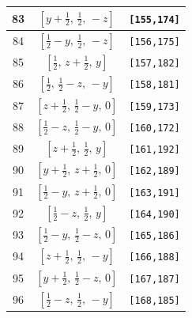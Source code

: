 \documentclass[fleqn,8pt]{jsarticle}
\begin{document}
\begin{longtable}{ccc}
83 & $\left[ y + \frac{1}{2},\, \frac{1}{2},\, - z \right]$ & {\tt [155,174]} \\ \hline
84 & $\left[ \frac{1}{2} - y,\, \frac{1}{2},\, - z \right]$ & {\tt [156,175]} \\ \hline
85 & $\left[ \frac{1}{2},\, z + \frac{1}{2},\, y \right]$ & {\tt [157,182]} \\ \hline
86 & $\left[ \frac{1}{2},\, \frac{1}{2} - z,\, - y \right]$ & {\tt [158,181]} \\ \hline
87 & $\left[ z + \frac{1}{2},\, \frac{1}{2} - y,\, 0 \right]$ & {\tt [159,173]} \\ \hline
88 & $\left[ \frac{1}{2} - z,\, \frac{1}{2} - y,\, 0 \right]$ & {\tt [160,172]} \\ \hline
89 & $\left[ z + \frac{1}{2},\, \frac{1}{2},\, y \right]$ & {\tt [161,192]} \\ \hline
90 & $\left[ y + \frac{1}{2},\, z + \frac{1}{2},\, 0 \right]$ & {\tt [162,189]} \\ \hline
91 & $\left[ \frac{1}{2} - y,\, z + \frac{1}{2},\, 0 \right]$ & {\tt [163,191]} \\ \hline
92 & $\left[ \frac{1}{2} - z,\, \frac{1}{2},\, y \right]$ & {\tt [164,190]} \\ \hline
93 & $\left[ \frac{1}{2} - y,\, \frac{1}{2} - z,\, 0 \right]$ & {\tt [165,186]} \\ \hline
94 & $\left[ z + \frac{1}{2},\, \frac{1}{2},\, - y \right]$ & {\tt [166,188]} \\ \hline
95 & $\left[ y + \frac{1}{2},\, \frac{1}{2} - z,\, 0 \right]$ & {\tt [167,187]} \\ \hline
96 & $\left[ \frac{1}{2} - z,\, \frac{1}{2},\, - y \right]$ & {\tt [168,185]} \\
\end{longtable}
\renewcommand{\arraystretch}{1.2}
\end{document}
